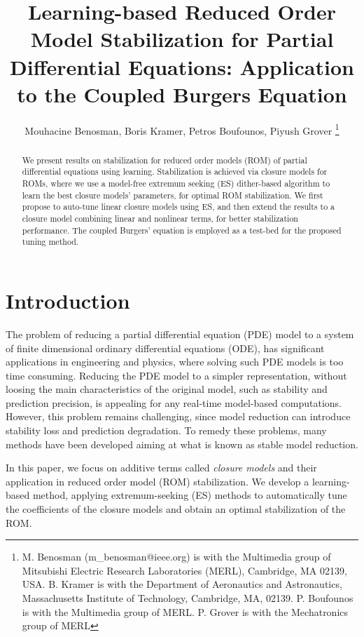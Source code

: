 \documentclass[letterpaper,conference,onecolumn,11pt]{IEEEtran}
\begin{document}
\title{Learning-based Reduced Order Model Stabilization for Partial Differential Equations: Application to the Coupled Burgers Equation}
\author{Mouhacine Benosman, Boris Kramer, Petros Boufounos, Piyush Grover
\thanks{ M. Benosman
(m{\_}benosman@ieee.org) is with the Multimedia group of
Mitsubishi Electric Research Laboratories (MERL), Cambridge, MA
02139, USA. B. Kramer is with the Department of Aeronautics and
Astronautics,  Massachusetts Institute of Technology, Cambridge,
MA, 02139. P. Boufounos is with the Multimedia group of MERL. P.
Grover is with the Mechatronics group of MERL}}

\maketitle


\begin{abstract}
We present results on stabilization for reduced order models (ROM)
of partial differential equations using learning. Stabilization is
achieved via closure models for ROMs, where we use a model-free
extremum seeking (ES) dither-based algorithm to learn the best
closure models' parameters, for optimal ROM stabilization. We
first propose to auto-tune linear closure models using ES, and
then extend the results to a closure model combining linear and
nonlinear terms, for better stabilization performance. The coupled
Burgers' equation is employed as a test-bed for the proposed
tuning method.
\end{abstract}

\section{Introduction}
\label{intro} The problem of reducing a partial differential
equation (PDE) model to a system of finite dimensional ordinary
differential equations (ODE), has significant applications in
engineering and physics, where solving such PDE models is too time
consuming. Reducing the PDE model to a simpler representation,
without loosing the main characteristics of the original model,
such as stability and prediction precision, is appealing for any
real-time model-based computations. However, this problem remains
challenging, since model reduction can introduce stability loss
and prediction degradation. To remedy these problems, many methods
have been developed aiming at what is known as stable model
reduction.

In this paper, we focus on additive terms called {\em closure
models} and their application in reduced order model (ROM)
stabilization. We develop a learning-based method, applying
extremum-seeking (ES) methods to automatically tune the
coefficients of the closure models and obtain an optimal
stabilization of the ROM.
\end{document}
